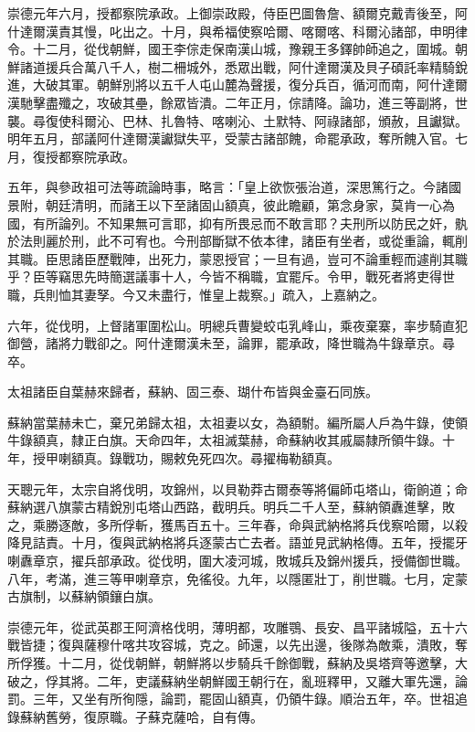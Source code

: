 \begin{pinyinscope}
崇德元年六月，授都察院承政。上御崇政殿，侍臣巴圖魯詹、額爾克戴青後至，阿什達爾漢責其慢，叱出之。十月，與希福使察哈爾、喀爾喀、科爾沁諸部，申明律令。十二月，從伐朝鮮，國王李倧走保南漢山城，豫親王多鐸帥師追之，圍城。朝鮮諸道援兵合萬八千人，樹二柵城外，悉眾出戰，阿什達爾漢及貝子碩託率精騎銳進，大破其軍。朝鮮別將以五千人屯山麓為聲援，復分兵百，循河而南，阿什達爾漢馳擊盡殲之，攻破其壘，餘眾皆潰。二年正月，倧請降。論功，進三等副將，世襲。尋復使科爾沁、巴林、扎魯特、喀喇沁、土默特、阿祿諸部，頒赦，且讞獄。明年五月，部議阿什達爾漢讞獄失平，受蒙古諸部餽，命罷承政，奪所餽入官。七月，復授都察院承政。

五年，與參政祖可法等疏論時事，略言：「皇上欲恢張治道，深思篤行之。今諸國景附，朝廷清明，而諸王以下至諸固山額真，彼此瞻顧，第念身家，莫肯一心為國，有所論列。不知果無可言耶，抑有所畏忌而不敢言耶？夫刑所以防民之奸，骫於法則麗於刑，此不可宥也。今刑部斷獄不依本律，諸臣有坐者，或從重論，輒削其職。臣思諸臣歷戰陣，出死力，蒙恩授官；一旦有過，豈可不論重輕而遽削其職乎？臣等竊思先時簡選議事十人，今皆不稱職，宜罷斥。令甲，戰死者將吏得世職，兵則恤其妻孥。今又未盡行，惟皇上裁察。」疏入，上嘉納之。

六年，從伐明，上督諸軍圍松山。明總兵曹變蛟屯乳峰山，乘夜棄寨，率步騎直犯御營，諸將力戰卻之。阿什達爾漢未至，論罪，罷承政，降世職為牛錄章京。尋卒。

太祖諸臣自葉赫來歸者，蘇納、固三泰、瑚什布皆與金臺石同族。

蘇納當葉赫未亡，棄兄弟歸太祖，太祖妻以女，為額駙。編所屬人戶為牛錄，使領牛錄額真，隸正白旗。天命四年，太祖滅葉赫，命蘇納收其戚屬隸所領牛錄。十年，授甲喇額真。錄戰功，賜敕免死四次。尋擢梅勒額真。

天聰元年，太宗自將伐明，攻錦州，以貝勒莽古爾泰等將偏師屯塔山，衛餉道；命蘇納選八旗蒙古精銳別屯塔山西路，截明兵。明兵二千人至，蘇納領纛進擊，敗之，乘勝逐敵，多所俘斬，獲馬百五十。三年春，命與武納格將兵伐察哈爾，以殺降見詰責。十月，復與武納格將兵逐蒙古亡去者。語並見武納格傳。五年，授擺牙喇纛章京，擢兵部承政。從伐明，圍大凌河城，敗城兵及錦州援兵，授備御世職。八年，考滿，進三等甲喇章京，免徭役。九年，以隱匿壯丁，削世職。七月，定蒙古旗制，以蘇納領鑲白旗。

崇德元年，從武英郡王阿濟格伐明，薄明都，攻雕鶚、長安、昌平諸城隘，五十六戰皆捷；復與薩穆什喀共攻容城，克之。師還，以先出邊，後隊為敵乘，潰敗，奪所俘獲。十二月，從伐朝鮮，朝鮮將以步騎兵千餘御戰，蘇納及吳塔齊等邀擊，大破之，俘其將。二年，吏議蘇納坐朝鮮國王朝行在，亂班釋甲，又離大軍先還，論罰。三年，又坐有所徇隱，論罰，罷固山額真，仍領牛錄。順治五年，卒。世祖追錄蘇納舊勞，復原職。子蘇克薩哈，自有傳。


\end{pinyinscope}
